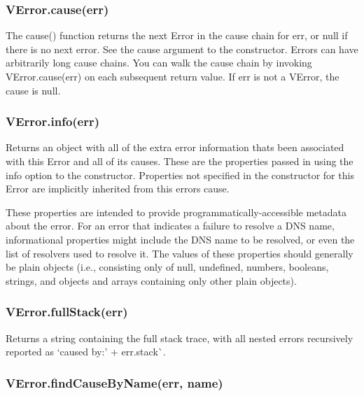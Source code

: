 \subsubsection*{{\ttfamily V\+Error.\+cause(err)}}

The {\ttfamily cause()} function returns the next Error in the cause chain for {\ttfamily err}, or {\ttfamily null} if there is no next error. See the {\ttfamily cause} argument to the constructor. Errors can have arbitrarily long cause chains. You can walk the {\ttfamily cause} chain by invoking {\ttfamily V\+Error.\+cause(err)} on each subsequent return value. If {\ttfamily err} is not a {\ttfamily V\+Error}, the cause is {\ttfamily null}.

\subsubsection*{{\ttfamily V\+Error.\+info(err)}}

Returns an object with all of the extra error information that\textquotesingle{}s been associated with this Error and all of its causes. These are the properties passed in using the {\ttfamily info} option to the constructor. Properties not specified in the constructor for this Error are implicitly inherited from this error\textquotesingle{}s cause.

These properties are intended to provide programmatically-\/accessible metadata about the error. For an error that indicates a failure to resolve a D\+NS name, informational properties might include the D\+NS name to be resolved, or even the list of resolvers used to resolve it. The values of these properties should generally be plain objects (i.\+e., consisting only of null, undefined, numbers, booleans, strings, and objects and arrays containing only other plain objects).

\subsubsection*{{\ttfamily V\+Error.\+full\+Stack(err)}}

Returns a string containing the full stack trace, with all nested errors recursively reported as `\textquotesingle{}caused by\+:' + err.\+stack\`{}.

\subsubsection*{{\ttfamily V\+Error.\+find\+Cause\+By\+Name(err, name)}}

